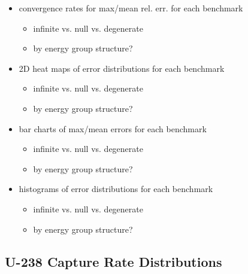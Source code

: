 \begin{itemize}[noitemsep]
  \item convergence rates for max/mean rel. err. for each benchmark
  \begin{itemize}[noitemsep]
    \item infinite vs. null vs. degenerate
    \item by energy group structure?
  \end{itemize}
  \item 2D heat maps of error distributions for each benchmark
  \begin{itemize}[noitemsep]
    \item infinite vs. null vs. degenerate
    \item by energy group structure?
  \end{itemize}
  \item bar charts of max/mean errors for each benchmark
  \begin{itemize}[noitemsep]
    \item infinite vs. null vs. degenerate
    \item by energy group structure?
  \end{itemize}
  \item histograms of error distributions for each benchmark
  \begin{itemize}[noitemsep]
    \item infinite vs. null vs. degenerate
    \item by energy group structure?
  \end{itemize}
\end{itemize}

\subsection{U-238 Capture Rate Distributions}
\label{subsec:chap8-capt-rates}

